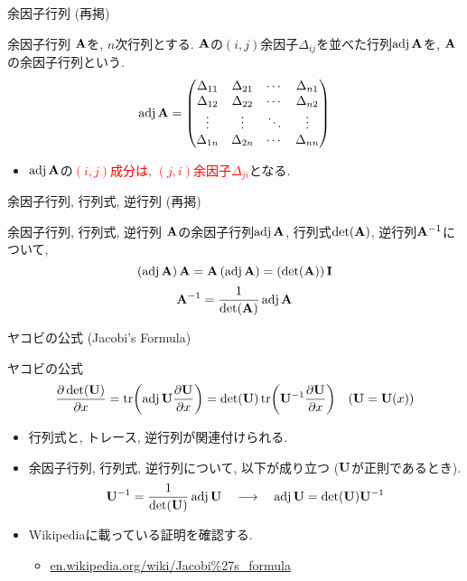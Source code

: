 \documentclass[dvipdfmx,notheorems,t]{beamer}
\begin{document}
\begin{frame}{余因子行列 (再掲)}
\begin{block}{余因子行列}
  $\vb{A}$を, $n$次行列とする.
  $\vb{A}$の$(i, j)$余因子$\Delta_{ij}$を並べた行列$\operatorname{adj} \vb{A}$を, $\vb{A}$の余因子行列という.
  $$\adj \vb{A} = \mqty(\Delta_{11} & \Delta_{21} & \cdots & \Delta_{n1} \\
    \Delta_{12} & \Delta_{22} & \cdots & \Delta_{n2} \\
    \vdots & \vdots & \ddots & \vdots \\
    \Delta_{1n} & \Delta_{2n} & \cdots & \Delta_{nn})$$
\end{block}

\begin{itemize}
  \item $\operatorname{adj} \vb{A}$の\textcolor{red}{$(i, j)$成分は, $(j, i)$余因子$\Delta_{ji}$}となる.
\end{itemize}
\end{frame}

\begin{frame}{余因子行列, 行列式, 逆行列 (再掲)}
\begin{block}{余因子行列, 行列式, 逆行列}
  $\vb{A}$の余因子行列$\operatorname{adj} \vb{A}$, 行列式$\det(\vb{A})$, 逆行列$\vb{A}^{-1}$について,
  $$\left( \operatorname{adj} \vb{A} \right) \vb{A} = \vb{A} \left( \operatorname{adj} \vb{A} \right)
    = \left( \det(\vb{A}) \right) \vb{I}$$
  $$\vb{A}^{-1} = \frac{1}{\det(\vb{A})} \operatorname{adj} \vb{A}$$
\end{block}
\end{frame}

\begin{frame}{ヤコビの公式 (Jacobi's Formula)}
\begin{block}{ヤコビの公式}
  \begin{align*}
    \pdv{\det(\vb{U})}{x} &= \tr(\operatorname{adj} \vb{U} \pdv{\vb{U}}{x})
      = \det(\vb{U}) \tr(\vb{U}^{-1} \pdv{\vb{U}}{x})
    & \text{($\vb{U} = \vb{U}(x)$)}
  \end{align*}
\end{block}

\begin{itemize}
  \item 行列式と, トレース, 逆行列が関連付けられる.
  \item 余因子行列, 行列式, 逆行列について, 以下が成り立つ ($\vb{U}$が正則であるとき).
  \begin{align*}
    \vb{U}^{-1} = \frac{1}{\det(\vb{U})} \operatorname{adj} \vb{U}
    \quad \longrightarrow \quad
    \operatorname{adj} \vb{U} = \det(\vb{U}) \vb{U}^{-1}
  \end{align*}
  \item Wikipediaに載っている証明を確認する.
  \begin{itemize}
    \item \url{en.wikipedia.org/wiki/Jacobi\%27s_formula}
  \end{itemize}
\end{itemize}
\end{frame}
\end{document}
